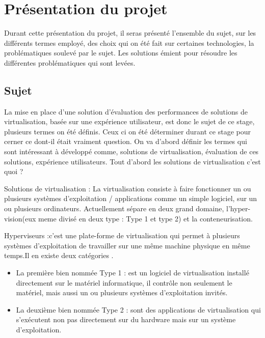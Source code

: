 \chapter{Présentation du projet}

Durant cette présentation du projet, il seras présenté l'ensemble du sujet, sur les différents termes employé, des choix qui on été fait sur certaines technologies, la problématiques soulevé par le sujet. Les solutions émient pour résoudre les différentes problématiques qui sont levées. 

\section{Sujet}

La mise en place d'une solution d’évaluation des performances de solutions de virtualisation, basée sur une expérience utilisateur, est donc le sujet de ce stage, plusieurs termes on été définis. Ceux ci on été déterminer durant ce stage pour cerner ce dont-il était vraiment question.  On va d'abord définir les termes qui sont intéressant à développé comme, solutions de virtualisation, évaluation de ces solutions, expérience utilisateurs. 
Tout d'abord les solutions de virtualisation c'est quoi ? 

\begin{mydef}
Solutions de virtualisation : La virtualisation consiste à faire fonctionner un ou plusieurs systèmes d'exploitation / applications comme un simple logiciel, sur un ou plusieurs ordinateurs. Actuellement sépare en deux grand domaine, l’hyper-vision(eux meme divisé en deux type : Type 1 et type 2) et la conteneurisation.
\end{mydef}

\begin{mydef}
Hyperviseurs :c'est une plate-forme de virtualisation qui permet à plusieurs systèmes d'exploitation de travailler sur une même machine physique en même temps.Il en existe deux catégories .
	\begin{itemize}
		\item La première bien nommée Type 1 :  est un logiciel de virtualisation installé directement sur le matériel informatique, il contrôle non seulement le matériel, mais aussi un ou plusieurs systèmes d'exploitation invités.
		\item La deuxième bien nommée Type 2 : sont des applications de virtualisation qui s’exécutent non pas directement sur du hardware mais sur un système d’exploitation.
	\end{itemize}
\end{mydef}

